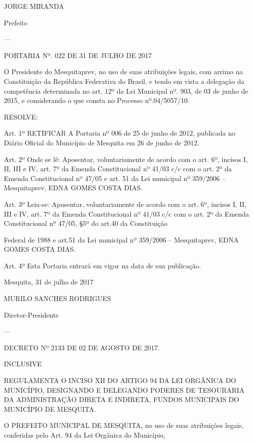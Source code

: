 \documentclass{doliberto}
\begin{document}
JORGE MIRANDA 

Prefeito 

---

PORTARIA Nº. 022 DE 31 DE JULHO DE 2017 

 

O  Presidente  do  Mesquitaprev,  no  uso  de  suas  atribuições 
legais, com arrimo na Constituição da República Federativa 
do  Brasil,  e  tendo  em  vista  a  delegação  da  competência 
determinada no art. 12º da Lei Municipal nº. 903, de 03 de 
junho  de  2015,  e  considerando  o  que  consta  no  Processo 
nº.04/5057/10. 
                                                                                                                                      
RESOLVE: 
 
Art.  1º  RETIFICAR  A  Portaria  nº  006  de  25  de  junho  de 
2012, publicada no Diário Oficial do Município de Mesquita 
em 26 de junho de 2012. 
 
Art.  2º  Onde  se  lê:  Aposentar,  voluntariamente  de  acordo 
com  o  art.  6º,  incisos  I,  II,  III  e  IV,  art.  7º  da  Emenda 
Constitucional  nº  41/03  c/c  com  o  art.  2º  da  Emenda 
Constitucional  nº  47/05  e  art.  51  da  Lei  municipal  nº 
359/2006 – Mesquitaprev, EDNA GOMES COSTA DIAS. 
 
Art. 3º Leia-se: Aposentar, voluntariamente de acordo com 
o  art.  6º,  incisos  I,  II,  III  e  IV,  art.  7º  da  Emenda 
Constitucional  nº  41/03  c/c  com  o  art.  2º  da  Emenda 
Constitucional  nº  47/05,  §5º  do  art.40  da  Constituição 

Federal  de  1988  e  art.51  da  Lei  municipal  nº  359/2006  – 
Mesquitaprev, EDNA GOMES COSTA DIAS.  
 
Art.  4º  Esta  Portaria  entrará  em  vigor  na  data  de  sua 
publicação.  
 

Mesquita, 31 de julho de 2017 
 

MURILO SANCHES RODRIGUES 

Diretor-Presidente 

---

DECRETO Nº 2133 DE 02 DE AGOSTO DE 2017. 

INCLUSIVE 

REGULAMENTA  O  INCISO  XII  DO  ARTIGO  94  DA  LEI 
ORGÂNICA  DO  MUNICÍPIO,  DESIGNANDO  E  DELEGANDO 
PODERES DE TESOURARIA DA ADMINISTRAÇÃO DIRETA E 
INDIRETA, 
FUNDOS  MUNICIPAIS  DO 
MUNICÍPIO DE MESQUITA. 
 
O  PREFEITO  MUNICIPAL  DE  MESQUITA,  no  uso  de  suas 
atribuições  legais,  conferidas  pelo  Art.  94  da  Lei  Orgânica 
do Município, 
 
\end{document}
